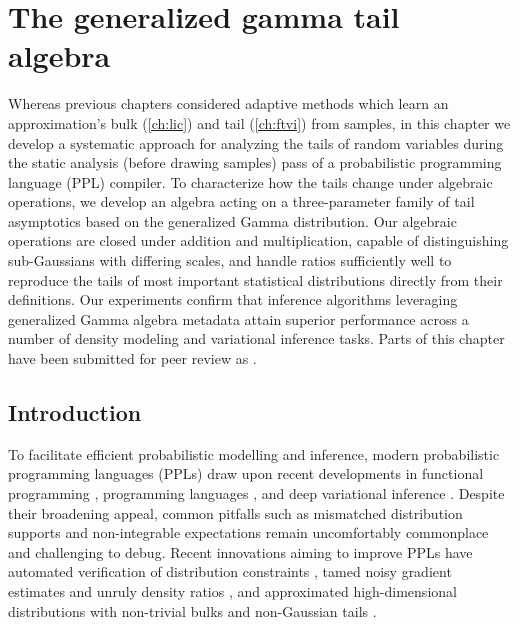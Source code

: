\documentclass[../thesis.tex]{subfiles}
\begin{document}
\chapter{The generalized gamma tail algebra}
\label{ch:hta}


Whereas previous chapters considered adaptive methods which learn an
approximation's bulk (\cref{ch:lic}) and tail (\cref{ch:ftvi}) from
samples, in this chapter we develop a
systematic approach for analyzing the tails of random variables during the
static analysis (before drawing samples) pass of a probabilistic programming
language (PPL) compiler. To characterize how the tails change under
algebraic operations, we develop an algebra acting on a three-parameter
family of tail asymptotics based on the generalized Gamma distribution. Our
algebraic operations are closed under addition and multiplication, capable
of distinguishing sub-Gaussians with differing scales, and handle ratios
sufficiently well to reproduce the tails of most important statistical
distributions directly from their definitions. Our experiments confirm that
inference algorithms leveraging generalized Gamma algebra metadata attain
superior performance across a number of density modeling and variational
inference tasks. Parts of this chapter have been submitted for peer review
as .

\section{Introduction}

To facilitate efficient probabilistic modelling and inference, modern probabilistic programming languages (PPLs) draw upon recent developments in functional programming \citep{tolpin2016design},
programming languages \citep{bernstein2019static},
and deep variational inference \citep{bingham2019pyro}.
Despite their broadening appeal, common pitfalls such as mismatched
distribution supports \citep{lee2019towards} and non-integrable expectations
\citep{wang2018variational,vehtari2015pareto,yao2018yes} remain uncomfortably
commonplace and challenging to debug.
Recent innovations aiming to improve PPLs have automated verification of
distribution constraints \citep{lee2019towards}, tamed noisy gradient estimates
\citep{eslami2016attend} and unruly density ratios
\citep{vehtari2015pareto,wang2018variational}, and approximated high-dimensional
distributions with non-trivial bulks \citep{papamakarios2021normalizing} and non-Gaussian tails \cite{jaini2020tails}.
\end{document}
